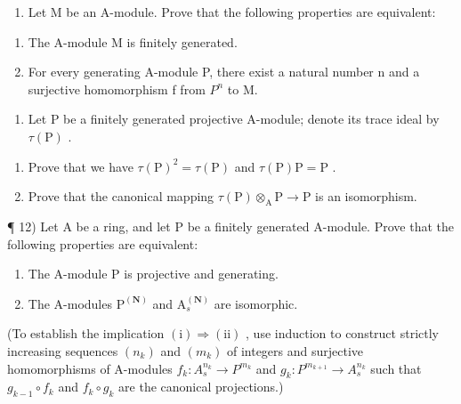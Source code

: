 \begin{enumerate}
\def\labelenumi{\arabic{enumi})}
\setcounter{enumi}{9}
\tightlist
\item
  Let M be an A-module. Prove that the following properties are equivalent:
\end{enumerate}

\begin{enumerate}
\def\labelenumi{(\roman{enumi})}
\item
  The A-module M is finitely generated.
\item
  For every generating A-module P, there exist a natural number n and a surjective homomorphism f from \(P^{n}\) to M.
\end{enumerate}

\begin{enumerate}
\def\labelenumi{\arabic{enumi})}
\setcounter{enumi}{10}
\tightlist
\item
  Let \(\mathrm{P}\) be a finitely generated projective A-module; denote its trace ideal by \(\tau(\mathrm{P})\) .\\
\end{enumerate}

\begin{enumerate}
\def\labelenumi{\alph{enumi})}
\item
  Prove that we have \(\tau(\mathrm{P})^2 = \tau(\mathrm{P})\) and \(\tau(\mathrm{P})\mathrm{P} = \mathrm{P}\) .
\item
  Prove that the canonical mapping \(\tau(\mathrm{P})\otimes_{\mathrm{A}}\mathrm{P}\to\mathrm{P}\) is an isomorphism.
\end{enumerate}

¶ 12) Let A be a ring, and let P be a finitely generated A-module. Prove that the following properties are equivalent:

\begin{enumerate}
\def\labelenumi{(\roman{enumi})}
\item
  The A-module P is projective and generating.
\item
  The A-modules \(\mathrm{P}^{(\mathbf{N})}\) and \(\mathrm{A}_s^{(\mathbf{N})}\) are isomorphic.
\end{enumerate}

(To establish the implication \((\mathrm{i})\Rightarrow(\mathrm{ii})\) , use induction to construct strictly increasing sequences \((n_{k})\) and \((m_{k})\) of integers and surjective homomorphisms of A-modules \(f_{k}:A_{s}^{n_{k}}\to P^{m_{k}}\) and \(g_{k}:P^{m_{k+1}}\to A_{s}^{n_{k}}\) such that \(g_{k-1}\circ f_{k}\) and \(f_{k}\circ g_{k}\) are the canonical projections.)

